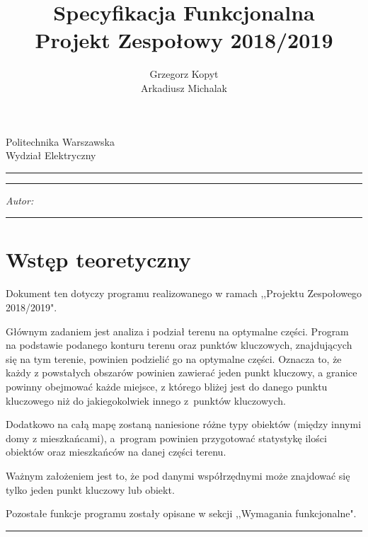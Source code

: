 \documentclass[a4paper,11pt]{article}
\author{Grzegorz Kopyt \\ Arkadiusz Michalak}
\title{Specyfikacja Funkcjonalna\\Projekt Zespołowy 2018/2019}
\makeatletter
\newcommand{\linia}{\rule{\linewidth}{0.4mm}}
\renewcommand{\maketitle}{\begin{titlepage}
    \vspace*{2cm}
    \begin{center}\LARGE
    Politechnika Warszawska\\
    Wydział Elektryczny\\
    \end{center}
    \vspace{5cm}
    \noindent\linia
    \begin{center}
      \LARGE \textsc{\@title}
         \end{center}
     \linia
    \vspace{0.5cm}
    \begin{flushright}
    \begin{minipage}{5cm}
    \textit{Autor:}\\
    \normalsize \textsc{\@author} \par
    \end{minipage}
    \vspace{5cm}
     \end{flushright}
    \vspace*{\stretch{6}}
    \begin{center}
    \@date
    \end{center}
  \end{titlepage}
}
\makeatother
\begin{document}
\maketitle

\tableofcontents
\vspace{1cm}
\noindent\linia
\section{Wstęp teoretyczny}
Dokument ten dotyczy programu realizowanego w ramach ,,Projektu Zespołowego 2018/2019".

Głównym zadaniem jest analiza i podział terenu na optymalne części. Program na podstawie podanego konturu terenu oraz punktów kluczowych, znajdujących się na tym terenie, powinien podzielić go na optymalne części. Oznacza to, że każdy z powstałych obszarów powinien zawierać jeden punkt kluczowy, a granice powinny obejmować każde miejsce, z którego bliżej jest do danego punktu kluczowego niż do jakiegokolwiek innego z~punktów kluczowych.

Dodatkowo na całą mapę zostaną naniesione różne typy obiektów (między innymi domy z mieszkańcami), a~program powinien przygotować statystykę ilości obiektów oraz mieszkańców na danej części terenu.

Ważnym założeniem jest to, że pod danymi współrzędnymi może znajdować się tylko jeden punkt kluczowy lub obiekt.

Pozostałe funkcje programu zostały opisane w sekcji ,,Wymagania funkcjonalne".

\noindent\linia
\end{document}
